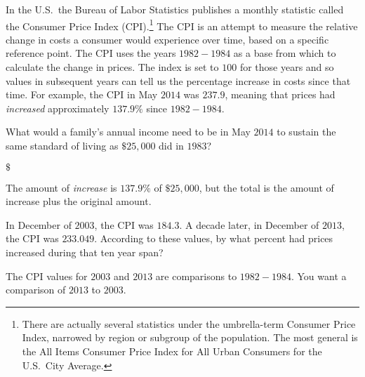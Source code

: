 \documentclass{ximera}
\begin{document}
In the U.S.\ the Bureau of Labor Statistics publishes a monthly statistic called the Consumer Price Index (CPI).\footnote{There are actually several statistics under the umbrella-term Consumer Price Index, narrowed by region or subgroup of the population. The most general is the All Items Consumer Price Index for All Urban Consumers for the U.S.\ City Average. } The CPI is an attempt to measure the relative change in costs a consumer would experience over time, based on a specific reference point. The CPI uses the years $1982-1984$ as a base from which to calculate the change in prices. The index is set to $100$ for those years and so values in subsequent years can tell us the percentage increase in costs since that time. For example, the CPI in May $2014$ was $237.9$, meaning that prices had \emph{increased} approximately $137.9\%$ since $1982-1984$.

\begin{question}
What would a family's annual income need to be in May $2014$ to sustain the same standard of living as $\$25,000$ did in $1983$?

$\$$

\begin{hint}
The amount of \emph{increase} is $137.9\%$ of $\$25,000$, but the total is the amount of increase plus the original amount.
\end{hint}	
\end{question}

\begin{question}
In December of $2003$, the CPI was $184.3$. A decade later, in December of $2013$, the CPI was $233.049$. According to these values, by what percent had prices increased during that ten year span?

\begin{multipleChoice}
\end{multipleChoice}

\begin{hint}
The CPI values for $2003$ and $2013$ are comparisons to $1982-1984$. You want a comparison of $2013$ to $2003$.
\end{hint}
\end{question}
\end{document}
